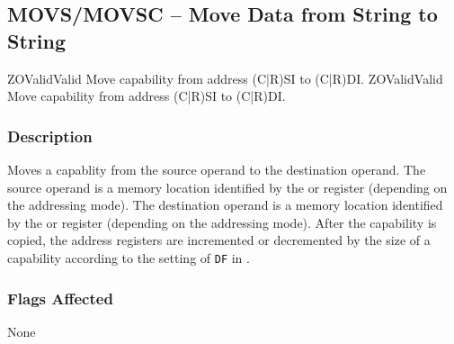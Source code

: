 \clearpage
{}
{}
\subsection*{MOVS/MOVSC -- Move Data from String to String}

\begin{x86opcodetable}
  {ZO}{Valid}{Valid}
  {Move capability from address (C|R)SI to (C|R)DI.}
  {ZO}{Valid}{Valid}
  {Move capability from address (C|R)SI to (C|R)DI.}
\end{x86opcodetable}

\begin{x86opentable}
\end{x86opentable}

\subsubsection*{Description}

Moves a capablity from the source operand to the destination operand.
The source operand is a memory location identified by the \RSI{} or
\CSI{} register (depending on the addressing mode).  The destination
operand is a memory location identified by the \RDI{} or \CDI{}
register (depending on the addressing mode).  After the capability is
copied, the address registers are incremented or decremented by the
size of a capability according to the setting of \texttt{DF} in
\RFLAGS{}.

\subsubsection*{Flags Affected}

None
